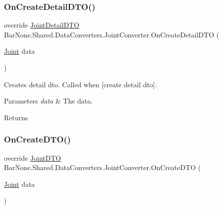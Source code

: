 \subsubsection{\texorpdfstring{On\+Create\+Detail\+D\+T\+O()}{OnCreateDetailDTO()}}
{\footnotesize\ttfamily override \mbox{\hyperlink{class_bar_none_1_1_shared_1_1_data_transfer_1_1_joint_detail_d_t_o}{Joint\+Detail\+D\+TO}} Bar\+None.\+Shared.\+Data\+Converters.\+Joint\+Converter.\+On\+Create\+Detail\+D\+TO (\begin{DoxyParamCaption}\item[{\mbox{\hyperlink{class_bar_none_1_1_shared_1_1_domain_model_1_1_joint}{Joint}}}]{data }\end{DoxyParamCaption})}



Creates detail dto. Called when \mbox{[}create detail dto\mbox{]}. 


\begin{DoxyParams}{Parameters}
{\em data} & The data.\\
\hline
\end{DoxyParams}
\begin{DoxyReturn}{Returns}

\end{DoxyReturn}
\mbox{\label{class_bar_none_1_1_shared_1_1_data_converters_1_1_joint_converter_a6478aa699dbcbb8ff632fbedfc835652}} 
\subsubsection{\texorpdfstring{On\+Create\+D\+T\+O()}{OnCreateDTO()}}
{\footnotesize\ttfamily override \mbox{\hyperlink{class_bar_none_1_1_shared_1_1_data_transfer_1_1_joint_d_t_o}{Joint\+D\+TO}} Bar\+None.\+Shared.\+Data\+Converters.\+Joint\+Converter.\+On\+Create\+D\+TO (\begin{DoxyParamCaption}\item[{\mbox{\hyperlink{class_bar_none_1_1_shared_1_1_domain_model_1_1_joint}{Joint}}}]{data }\end{DoxyParamCaption})}



